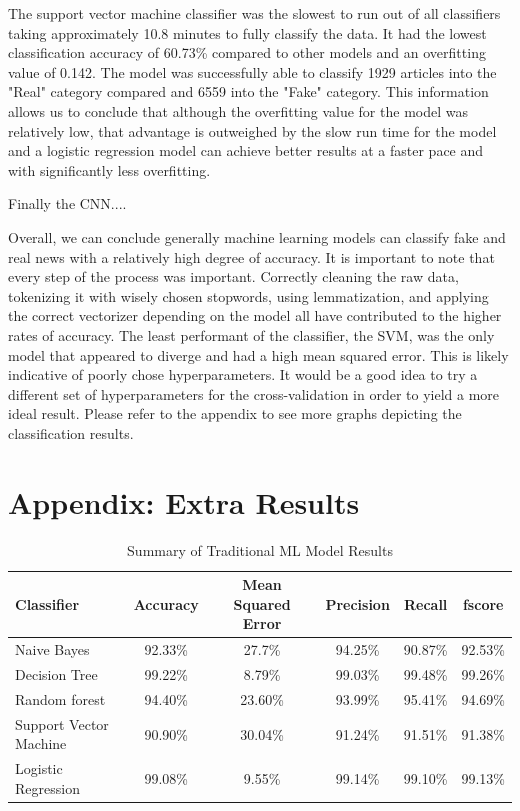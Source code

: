 \documentclass[10pt,twocolumn,letterpaper]{article}
\begin{document}
The support vector machine classifier was the slowest to run out of all classifiers taking approximately 10.8 minutes to fully classify the data. It had the lowest classification accuracy of 60.73\% compared to other models and an overfitting value of 0.142. The model was successfully able to classify 1929 articles into the "Real" category compared and 6559 into the "Fake" category. This information allows us to conclude that although the overfitting value for the model was relatively low, that advantage is outweighed by the slow run time for the model and a logistic regression model can achieve better results at a faster pace and with significantly less overfitting. \par

Finally the CNN.... \par

Overall, we can conclude generally machine learning models can classify fake and real news with a relatively high degree of accuracy. It is important to note that every step of the process was important. Correctly cleaning the raw data, tokenizing it with wisely chosen stopwords, using lemmatization, and applying the correct vectorizer depending on the model all have contributed to the higher rates of accuracy. The least performant of the classifier, the SVM, was the only model that appeared to diverge and had a high mean squared error. This is likely indicative of poorly chose hyperparameters. It would be a good idea to try a different set of hyperparameters for the cross-validation in order to yield a more ideal result. 
Please refer to the appendix to see more graphs depicting the classification results.


{\small
\raggedright


}

\newpage
\appendix
\onecolumn
\section*{Appendix: Extra Results}\centering
\begin{table}[!hb]\centering
   \begin{center}
   \begin{tabular}{|l|c|c|c|c|c|}
   \hline
    Classifier & Accuracy & Mean Squared Error & Precision & Recall & fscore\\
   \hline\hline
   Naive Bayes & 92.33\% & 27.7\% & 94.25\% & 90.87\% & 92.53\% \\
   Decision Tree & 99.22\% & 8.79\% & 99.03\% & 99.48\% & 99.26\% \\
   Random forest & 94.40\% & 23.60\% & 93.99\% & 95.41\% & 94.69\%\\
   Support Vector Machine & 90.90\% & 30.04\% & 91.24\% & 91.51\% & 91.38\% \\
   Logistic Regression & 99.08\% & 9.55\% & 99.14\% & 99.10\% & 99.13\% \\
   \hline
   \end{tabular}
   \end{center}
   \caption{Summary of Traditional ML Model Results\label{first_table}}
\end{table}
\end{document}

